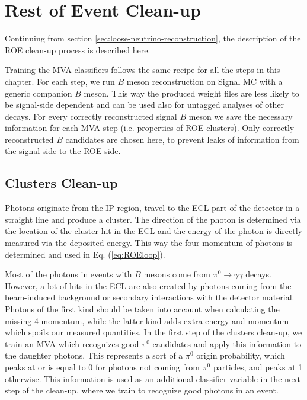 \chapter{Rest of Event Clean-up}
\label{ch:roe}

Continuing from section \ref{sec:loose-neutrino-reconstruction}, the description of the ROE clean-up process is described here. 

Training the MVA classifiers follows the same recipe for all the steps in this chapter. For each step, we run $B$ meson reconstruction on Signal MC with a generic companion $B$ meson. This way the produced weight files are less likely to be signal-side dependent and can be used also for untagged analyses of other decays. For every correctly reconstructed signal $B$ meson we save the necessary information for each MVA step (i.e. properties of ROE clusters). Only correctly reconstructed $B$ candidates are chosen here, to prevent leaks of information from the signal side to the ROE side.

\section{Clusters Clean-up}

Photons originate from the IP region, travel to the ECL part of the detector in a straight line and produce a cluster. The direction of the photon is determined via the location of the cluster hit in the ECL and the energy of the photon is directly measured via the deposited energy. This way the four-momentum of photons is determined and used in Eq. (\ref{eq:ROEloop}).

Most of the photons in events with $B$ mesons come from $\pi^0 \to \gamma \gamma$ decays. However, a lot of hits in the ECL are also created by photons coming from the beam-induced background or secondary interactions with the detector material. Photons of the first kind should be taken into account when calculating the missing 4-momentum, while the latter kind adds extra energy and momentum which spoils our measured quantities. In the first step of the clusters clean-up, we train an MVA which recognizes good $\pi^0$ candidates and apply this information to the daughter photons. This represents a sort of a $\pi^0$ origin probability, which peaks at or is equal to 0 for photons not coming from $\pi^0$ particles, and peaks at 1 otherwise. This information is used as an additional classifier variable in the next step of the clean-up, where we train to recognize good photons in an event.

